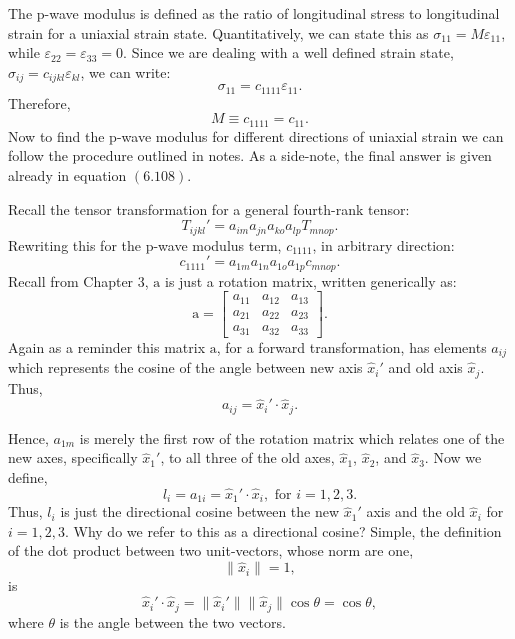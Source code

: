 \documentclass[12pt]{article}
\begin{document}
The p-wave modulus is defined as the ratio of longitudinal stress to longitudinal
strain for a uniaxial strain state. Quantitatively, we can state this as
$\sigma_{11} = M \varepsilon_{11}$, while $\varepsilon_{22} = \varepsilon_{33} = 0$.
Since we are dealing with a well defined
strain state, $\sigma_{ij} = c_{ijkl} \varepsilon_{kl}$, we can write:
\begin{equation}
  \sigma_{11} = c_{1111} \varepsilon_{11}.
\end{equation}
Therefore,
\begin{equation}
  M \equiv c_{1111} = c_{11}.
\end{equation}
Now to find the p-wave modulus for different directions of uniaxial strain we can
follow the procedure outlined in notes.
As a side-note, the final answer is given already in equation $(6.108)$.

Recall the tensor transformation for a general fourth-rank tensor:
\begin{equation}
  T_{ijkl}' = a_{im} a_{jn} a_{ko} a_{lp} T_{mnop}.
\end{equation}
Rewriting this for the p-wave modulus term, $c_{1111}$, in arbitrary direction:
\begin{equation}
  c_{1111}' = a_{1m} a_{1n} a_{1o} a_{1p} c_{mnop}.
\end{equation}
Recall from Chapter $3$, $\mathrm{ a }$ is just a rotation matrix, written generically as:
\begin{equation}
  \mathrm{ a } =
  \begin{bmatrix}
    a_{11} & a_{12} & a_{13} \\
    a_{21} & a_{22} & a_{23} \\
    a_{31} & a_{32} & a_{33}
  \end{bmatrix}.
\end{equation}
Again as a reminder this matrix $\mathrm{ a }$,
for a forward transformation, has elements $a_{ij}$ which represents the cosine of the angle
between new axis $\hat{x}_i'$ and old axis $\hat{x}_j$.
Thus,
\begin{equation}
  a_{ij} = \hat{x}_i' \cdot \hat{x}_j.
\end{equation}

Hence, $a_{1m}$ is merely the first row of the rotation matrix which relates one of the new axes,
specifically $\hat{x}_1'$, to all three of the old axes, $\hat{x}_1$, $\hat{x}_2$, and $\hat{x}_3$.
Now we define,
\begin{equation}
  l_i = a_{1i} = \hat{x}_1' \cdot \hat{x}_i, \text{ for } i = 1, 2, 3.
\end{equation}
Thus, $l_i$ is just the directional cosine between
the new $\hat{x}_1'$ axis and the old $\hat{x}_i$ for $i = 1, 2, 3$.
Why do we refer to this as a directional cosine?
Simple, the definition of the dot product between two unit-vectors, whose norm are one,
\begin{equation}
  \| \hat{x}_i \| = 1,
\end{equation}
is
\begin{equation}
  \hat{x}_i' \cdot \hat{x}_j = \| \hat{x}_i' \| \| \hat{x}_j \| \cos \theta = \cos \theta,
\end{equation}
where $\theta$ is the angle between the two vectors.
\end{document}
